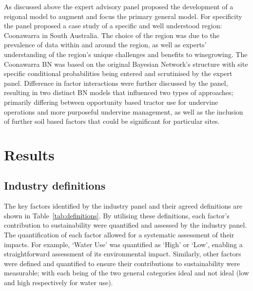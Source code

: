 \documentclass[fleqn,10pt]{wlscirep}
\begin{document}
As discussed above the expert advisory panel proposed the development of a reigonal model to augment and focus the primary general model. For specificity the panel proposed a case study of a specific and well understood region: Coonawarra in South Australia. The choice of the region was due to the prevalence of data within and around the region, as well as experts' understanding of the region's unique challenges and benefits to winegrowing. The Coonawarra BN was based on the original Bayesian Network's structure with site specific conditional probabilities being entered and scrutinised by the expert panel. Difference in factor interactions were further discussed by the panel, resulting in two distinct BN models that influenced two types of approaches; primarily differing between opportunity based tractor use for undervine operations and more purposeful undervine management, as well as the inclusion of further soil based factors that could be significant for particular sites.

\section{Results}

\subsection{Industry definitions}

The key factors identified by the industry panel and their agreed definitions are shown in Table~\ref{tab:definitions}. By utilising these definitions, each factor's contribution to sustainability were quantified and assessed by the industry panel. The quantification of each factor allowed for a systematic assessment of their impacts. For example, `Water Use' was quantified as `High' or `Low', enabling a straightforward assessment of its environmental impact. Similarly, other factors were defined and quantified to ensure their contributions to sustainability were measurable; with each being of the two general categories ideal and not ideal (low and high respectively for water use).

% 
% 
\end{document}
